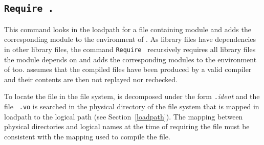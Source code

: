 
\subsection[\tt Require {\qualid}.]{\tt Require {\qualid}.\label{Require}
}

This command looks in the loadpath for a file containing
module {\qualid} and adds the corresponding module to the environment
of {\Coq}. As library files have dependencies in other library files,
the command {\tt Require {\qualid}} recursively requires all library
files the module {\qualid} depends on and adds the corresponding modules to the
environment of {\Coq} too. {\Coq} assumes that the compiled files have
been produced by a valid {\Coq} compiler and their contents are then not
replayed nor rechecked.

To locate the file in the file system, {\qualid} is decomposed under
the form {\dirpath}{\tt .}{\textsl{ident}} and the file {\ident}{\tt
.vo} is searched in the physical directory of the file system that is
mapped in {\Coq} loadpath to the logical path {\dirpath} (see
Section~\ref{loadpath}). The mapping between physical directories and
logical names at the time of requiring the file must be consistent
with the mapping used to compile the file.

